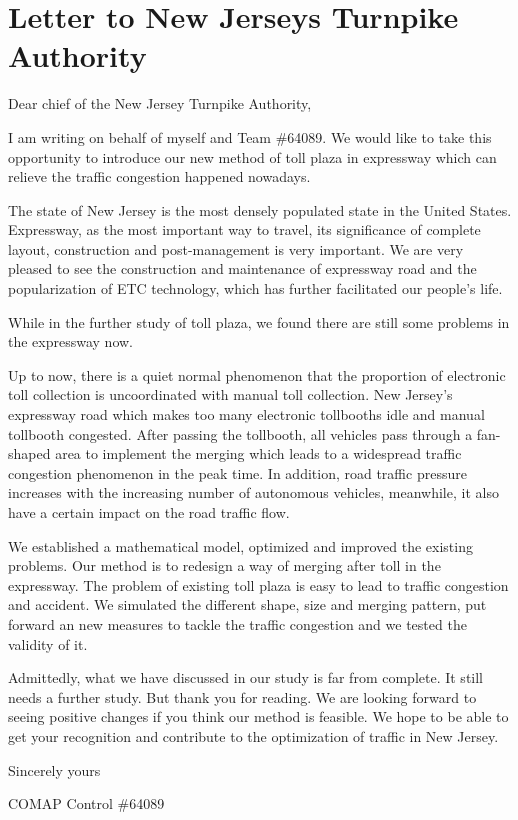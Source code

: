 \documentclass{mcmthesis}
\begin{document}
\section{Letter to New Jerseys Turnpike Authority}
Dear chief of the New Jersey Turnpike Authority,

I am writing on behalf of myself and Team \#64089. We would like to take this opportunity to introduce our new method of toll plaza in expressway which can relieve the traffic congestion happened nowadays.

The state of New Jersey is the most densely populated state in the United States. Expressway, as the most important way to travel, its significance of complete layout, construction and post-management is very important. We are very pleased to see the construction and maintenance of expressway road and the popularization of ETC technology, which has further facilitated our people's life.

While in the further study of toll plaza, we found there are still some problems in the expressway now.

Up to now, there is a quiet normal phenomenon that the proportion of electronic toll collection is uncoordinated with manual toll collection. New Jersey's expressway road which makes too many electronic tollbooths idle and manual tollbooth congested. After passing the tollbooth, all vehicles pass through a fan-shaped area to implement the merging which leads to a widespread traffic congestion phenomenon in the peak time. In addition, road traffic pressure increases with the increasing number of autonomous vehicles, meanwhile, it also have a certain impact on the road traffic flow.

We established a mathematical model, optimized and improved the existing problems. Our method is to redesign a way of merging after toll in the expressway. The problem of existing toll plaza is easy to lead to traffic congestion and accident.  We simulated the different shape, size and merging pattern, put forward an new measures to tackle the traffic congestion and we tested the validity of it.  

Admittedly, what we have discussed in our study is far from complete. It still needs a further study. But thank you for reading. We are looking forward to seeing positive changes if you think our method is feasible. We hope to be able to get your recognition and contribute to the optimization of traffic in New Jersey.


Sincerely yours

COMAP Control \#64089


\newpage


\newpage
\end{document}
